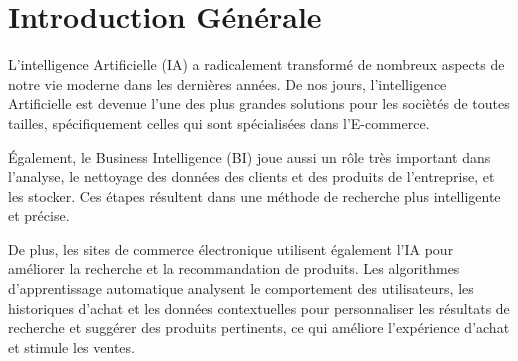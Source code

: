 \chapter{Introduction Générale}
\localtableofcontents

\newpage

\noindent
L'intelligence Artificielle (IA) a radicalement transformé de nombreux aspects de notre vie moderne dans les dernières années. De nos jours, l'intelligence Artificielle est devenue l'une des plus grandes solutions pour les sociètés de toutes tailles, spécifiquement celles qui sont spécialisées dans l'E-commerce.

\noindent
Également, le Business Intelligence (BI) joue aussi un rôle très important dans l'analyse, le nettoyage des données des clients et des produits de l'entreprise, et les stocker. Ces étapes résultent dans une méthode de recherche plus intelligente et précise.

\noindent
De plus, les sites de commerce électronique utilisent également l'IA pour améliorer la recherche et la recommandation de produits. Les algorithmes d'apprentissage automatique analysent le comportement des utilisateurs, les historiques d'achat et les données contextuelles pour personnaliser les résultats de recherche et suggérer des produits pertinents, ce qui améliore l'expérience d'achat et stimule les ventes.

\newpage